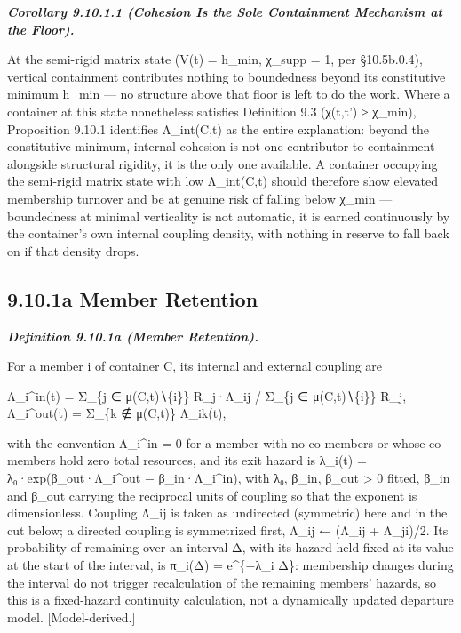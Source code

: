 \documentclass[
]{article}
\begin{document}
\emph{\textbf{Corollary 9.10.1.1 (Cohesion Is the Sole Containment
Mechanism at the Floor).}}

At the semi-rigid matrix state (V(t) = h\_min, χ\_supp = 1, per
§10.5b.0.4), vertical containment contributes nothing to boundedness
beyond its constitutive minimum h\_min --- no structure above that floor
is left to do the work. Where a container at this state nonetheless
satisfies Definition 9.3 (χ(t,t') ≥ χ\_min), Proposition 9.10.1
identifies Λ\_int(C,t) as the entire explanation: beyond the
constitutive minimum, internal cohesion is not one contributor to
containment alongside structural rigidity, it is the only one available.
A container occupying the semi-rigid matrix state with low Λ\_int(C,t)
should therefore show elevated membership turnover and be at genuine
risk of falling below χ\_min --- boundedness at minimal verticality is
not automatic, it is earned continuously by the container's own internal
coupling density, with nothing in reserve to fall back on if that
density drops.

\hypertarget{a-member-retention}{%
\subsection{9.10.1a Member Retention}\label{a-member-retention}}

\emph{\textbf{Definition 9.10.1a (Member Retention).}}

For a member i of container C, its internal and external coupling are

Λ\_i\^{}in(t) = Σ\_\{j ∈ μ(C,t)∖\{i\}\} R\_j·Λ\_ij / Σ\_\{j ∈
μ(C,t)∖\{i\}\} R\_j, Λ\_i\^{}out(t) = Σ\_\{k ∉ μ(C,t)\} Λ\_ik(t),

with the convention Λ\_i\^{}in = 0 for a member with no co-members or
whose co-members hold zero total resources, and its exit hazard is
λ\_i(t) = λ₀·exp(β\_out·Λ\_i\^{}out − β\_in·Λ\_i\^{}in), with λ₀, β\_in,
β\_out \textgreater{} 0 fitted, β\_in and β\_out carrying the reciprocal
units of coupling so that the exponent is dimensionless. Coupling Λ\_ij
is taken as undirected (symmetric) here and in the cut below; a directed
coupling is symmetrized first, Λ\_ij ← (Λ\_ij + Λ\_ji)/2. Its
probability of remaining over an interval Δ, with its hazard held fixed
at its value at the start of the interval, is π\_i(Δ) = e\^{}\{−λ\_i
Δ\}: membership changes during the interval do not trigger recalculation
of the remaining members' hazards, so this is a fixed-hazard continuity
calculation, not a dynamically updated departure model.
{[}Model-derived.{]}
\end{document}
